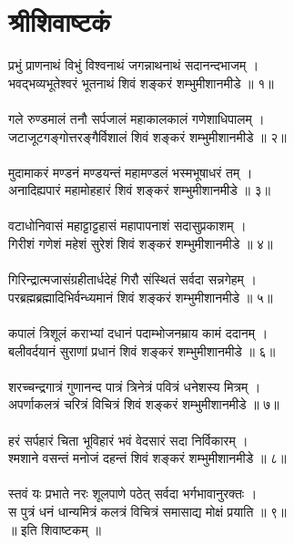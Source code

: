 \section{\sanskrit श्रीशिवाष्टकं }
\chandas
प्रभुं प्राणनाथं विभुं विश्वनाथं जगन्नाथनाथं सदानन्दभाजम् ।\\
भवद्भव्यभूतेश्वरं भूतनाथं शिवं शङ्करं शम्भुमीशानमीडे ॥ १॥\\
\\
गले रुण्डमालं तनौ सर्पजालं महाकालकालं गणेशाधिपालम् ।\\
जटाजूटगङ्गोत्तरङ्गैर्विशालं शिवं शङ्करं शम्भुमीशानमीडे ॥ २॥\\
\\
मुदामाकरं मण्डनं मण्डयन्तं महामण्डलं भस्मभूषाधरं तम् ।\\
अनादिह्यपारं महामोहहारं शिवं शङ्करं शम्भुमीशानमीडे ॥ ३॥\\
\\
वटाधोनिवासं महाट्टाट्टहासं महापापनाशं सदासुप्रकाशम् ।\\
गिरीशं गणेशं महेशं सुरेशं शिवं शङ्करं शम्भुमीशानमीडे ॥ ४॥\\
\\
गिरिन्द्रात्मजासंग्रहीतार्धदेहं गिरौ संस्थितं सर्वदा सन्नगेहम् ।\\
परब्रह्मब्रह्मादिभिर्वन्ध्यमानं शिवं शङ्करं शम्भुमीशानमीडे ॥ ५॥\\
\\
कपालं त्रिशूलं कराभ्यां दधानं पदाम्भोजनम्राय कामं ददानम् ।\\
बलीवर्दयानं सुराणां प्रधानं शिवं शङ्करं शम्भुमीशानमीडे ॥ ६॥\\
\\
शरच्चन्द्रगात्रं गुणानन्द पात्रं त्रिनेत्रं पवित्रं धनेशस्य मित्रम् ।\\
अपर्णाकलत्रं चरित्रं विचित्रं शिवं शङ्करं शम्भुमीशानमीडे ॥ ७॥\\
\\
हरं सर्पहारं चिता भूविहारं भवं वेदसारं सदा निर्विकारम् ।\\
श्मशाने वसन्तं मनोजं दहन्तं शिवं शङ्करं शम्भुमीशानमीडे ॥ ८॥\\
\\
स्तवं यः प्रभाते नरः शूलपाणे पठेत् सर्वदा भर्गभावानुरक्तः ।\\
स पुत्रं धनं धान्यमित्रं कलत्रं विचित्रं समासाद्य मोक्षं प्रयाति ॥ ९॥\\
॥ इति शिवाष्टकम् ॥\\

